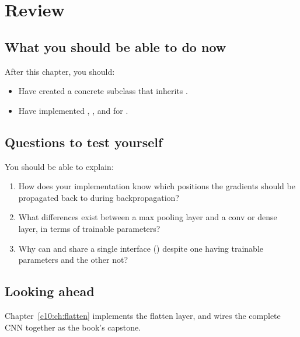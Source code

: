 
\section{Review}
\label{c9:sec:review}

\subsection*{What you should be able to do now}
After this chapter, you should:
\begin{itemize}
  \item Have created a concrete subclass  that inherits
    .
  \item Have implemented , , and  for
    .
\end{itemize}

\subsection*{Questions to test yourself}
You should be able to explain:
\begin{enumerate}
  \item How does your  implementation know which positions the
    gradients should be propagated back to during backpropagation?
  \item What differences exist between a max pooling layer and a conv or dense layer, in terms of
    trainable parameters?
  \item Why can  and  share a single interface
    () despite one having trainable parameters and the other not?
\end{enumerate}

\subsection*{Looking ahead}
Chapter~\ref{c10:ch:flatten} implements the flatten layer, and wires the complete CNN together as
the book's capstone.
